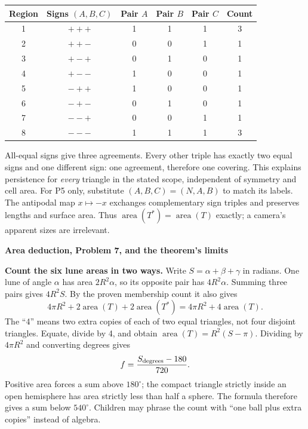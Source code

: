 \documentclass[11pt,letterpaper]{article}
\newcommand{\topic}[1]{\par{\large\bfseries\color{blue}#1}\par}
\newcommand{\degc}{^\circ}
\begin{document}
\begin{center}\begin{tabular}{c|c|ccc|c}
Region & Signs $(A,B,C)$ & Pair $A$ & Pair $B$ & Pair $C$ & Count\\\hline
1 & $+++ $ &1&1&1&3\\
2 & $++- $ &0&0&1&1\\
3 & $+-+ $ &0&1&0&1\\
4 & $+-- $ &1&0&0&1\\
5 & $-++ $ &1&0&0&1\\
6 & $-+- $ &0&1&0&1\\
7 & $--+ $ &0&0&1&1\\
8 & $--- $ &1&1&1&3
\end{tabular}\end{center}
All-equal signs give three agreements. Every other triple has exactly two equal signs and one different sign: one agreement, therefore one covering. This explains persistence for \emph{every} triangle in the stated scope, independent of symmetry and cell area. For P5 only, substitute $(A,B,C)=(N,A,B)$ to match its labels. The antipodal map $x\mapsto-x$ exchanges complementary sign triples and preserves lengths and surface area. Thus $\operatorname{area}(T^*)=\operatorname{area}(T)$ exactly; a camera's apparent sizes are irrelevant.

\newpage
\topic{Area deduction, Problem 7, and the theorem's limits}
\textbf{Count the six lune areas in two ways.} Write $S=\alpha+\beta+\gamma$ in radians. One lune of angle $\alpha$ has area $2R^2\alpha$, so its opposite pair has $4R^2\alpha$. Summing three pairs gives $4R^2S$. By the proven membership count it also gives
\[
 4\pi R^2+2\operatorname{area}(T)+2\operatorname{area}(T^*)
 =4\pi R^2+4\operatorname{area}(T).
\]
The ``4'' means two extra copies of each of two equal triangles, not four disjoint triangles. Equate, divide by 4, and obtain $\operatorname{area}(T)=R^2(S-\pi)$. Dividing by $4\pi R^2$ and converting degrees gives
\[
 f=\frac{S_{\rm degrees}-180}{720}.
\]
Positive area forces a sum above $180\degc$; the compact triangle strictly inside an open hemisphere has area strictly less than half a sphere. The formula therefore gives a sum below $540\degc$. Children may phrase the count with ``one ball plus extra copies'' instead of algebra.
\end{document}
